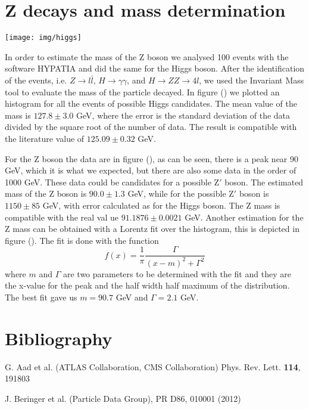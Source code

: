 \documentclass[%
 reprint,
 amsmath,amssymb,
 aps,
]{revtex4-1}
\begin{document}
\section{Z decays and mass determination}
\begin{minipage}{\textwidth}
\texttt{[image: img/higgs]}
\end{minipage}

In order to estimate the mass of the Z boson we analysed 100 events with the software HYPATIA and did the same for the Higgs boson. After the identification of the events, i.e. $Z \to l\bar{l}$, $H\to \gamma\gamma$, and $H\to ZZ\to4l$, we used the Invariant Mass tool to evaluate the mass of the particle decayed. In figure () we plotted an histogram for all the events of possible Higgs candidates. The mean value of the mass is $127.8\pm 3.0$ GeV, where the error is the standard deviation of the data divided by the square root of the number of data. The result is compatible with the literature value \cite{masshiggs} of  $125.09\pm 0.32$ GeV.

For the Z boson the data are in figure (), as can be seen, there is a peak near 90 GeV, which it is what we expected, but there are also some data in the order of 1000 GeV. These data could be candidates for a possible Z$'$ boson. The estimated mass of the Z boson is $90.0\pm1.3$ GeV, while for the possible Z$'$ boson is $1150\pm85$ GeV, with error calculated as for the Higgs boson. The Z mass is compatible with the real val ue \cite{Zmass} $91.1876 \pm 0.0021$ GeV. Another estimation for the Z mass can be obtained with a Lorentz fit over the histogram, this is depicted in figure (). The fit is done with the function
\[f(x) = \frac{1}{\pi}\frac{\Gamma}{(x-m)^2+\Gamma^2}\]
where $m$ and $\Gamma$ are two parameters to be determined with the fit and they are the x-value for the peak and the half width half maximum of the distribution. The best fit gave us $m = 90.7$ GeV and $\Gamma = 2.1$ GeV.
\section{Bibliography}
\begin{thebibliography}{99}

    G. Aad et al. (ATLAS Collaboration, CMS Collaboration) Phys. Rev. Lett. {\bf 114}, 191803

   J. Beringer et al. (Particle Data Group), PR D86, 010001 (2012)

\end{thebibliography}
\end{document}
